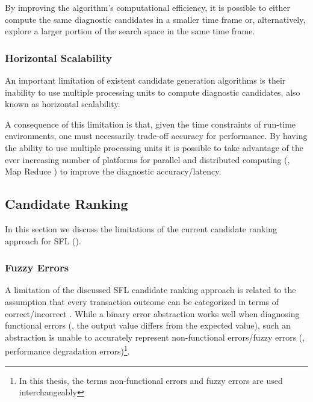 By improving the algorithm's computational efficiency, it is possible
to either compute the same diagnostic candidates in a smaller time
frame or, alternatively, explore a larger portion of the search space
in the same time frame.
%


\subsubsection{Horizontal Scalability}
\label{sec:intro:research-goals:horizontal-scalability}

An important limitation of existent candidate generation algorithms is
their inability to use multiple processing units to compute diagnostic
candidates, also known as horizontal scalability.
%

A consequence of this limitation is that, given the time constraints
of run-time environments, one must necessarily trade-off accuracy for
performance.
%
By having the ability to use multiple processing units it is possible
to take advantage of the ever increasing number of platforms for
parallel and distributed computing (\eg, Map Reduce \citep{Dean04}) to
improve the diagnostic accuracy/latency.



\subsection{Candidate Ranking}
\label{sec:intro:research-goals:candidate-ranking}
In this section we discuss the limitations of the current candidate
ranking approach for \ac{SFL}
().

\subsubsection{Fuzzy Errors}
\label{sec:intro:research-goals:fuzzy-errors}
A limitation of the discussed \ac{SFL} candidate ranking approach is
related to the assumption that every transaction outcome can be
categorized in terms of correct/incorrect
\citep{Abreu09a,Kleer09,Casanova13,Chen13}.
%
While a binary error abstraction works well when diagnosing functional
errors (\ie, the output value differs from the expected value), such
an abstraction is unable to accurately represent non-functional
errors/fuzzy errors (\eg, performance degradation errors)\footnote{In
  this thesis, the terms non-functional errors and fuzzy errors are
  used interchangeably}.

